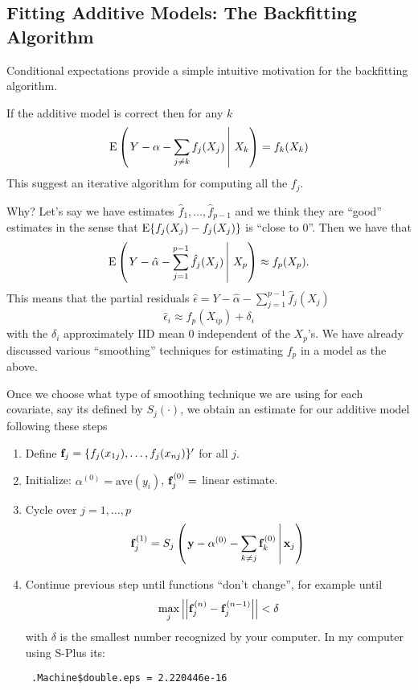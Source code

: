 \centerline{}

\subsection{Fitting Additive Models: The Backfitting Algorithm}
Conditional expectations provide a simple intuitive motivation for the
backfitting algorithm.

If the additive model is correct then for any $k$
\[
\mbox{E}\left(\left. Y - \alpha - \sum_{j\neq k} f_j(X_j) \, \right| \,X_k
\right) = f_k(X_k) 
\]
This suggest an iterative algorithm for computing all the $f_j$. 

Why? Let's say we have estimates $\hat{f}_1,\dots,\hat{f}_{p-1}$ and we
think they are ``good'' estimates in the sense that $\mbox{E}\{{f}_j(X_j) -
f_j(X_j)\}$ is ``close to 0''. Then we have that 
\[ 
\mbox{E}\left(\left.Y - \hat{\alpha} - \sum_{j=1}^{p-1} \hat{f}_j(X_j) \,
  \right| \, X_p \right) 
\approx f_p(X_p).
\]
This means that the partial residuals $\hat{\epsilon} = Y -
\hat{\alpha} - \sum_{j=1}^{p-1} \hat{f}_j(X_j) $ 
\[
\hat{\epsilon}_i \approx f_p(X_{ip}) + \delta_i
\]
with the $\delta_i$ approximately IID mean 0 independent of the
$X_p$'s. We have already discussed various ``smoothing'' techniques
for estimating $f_p$ in a model as the above.

Once we choose what type of smoothing technique we are using
for each covariate, say its defined by $S_j(\cdot)$, we obtain an
estimate for our 
additive model following these steps 
\begin{enumerate}
\item Define ${\mathbf f}_j = \{f_j(x_{1j}),\dots,f_j(x_{nj})\}'$ for all $j$.
\item Initialize: $\alpha^{(0)} = \mbox{ave}(y_i)$, ${\mathbf f}_j^{(0)} = $ linear
  estimate. 
\item Cycle over $j=1,\dots,p$
\[
{\mathbf f}_j^{(1)} = S_j\left(\left. {\mathbf y} - \alpha^{(0)} - \sum_{k\neq j}
  \mathbf{f}^{(0)}_k
  \, \right| {\mathbf x}_j \right)
\]
\item Continue previous step until functions ``don't change'', for
  example until 
\[
\max_{j} \left|\left| {\mathbf f}_j^{(n)} - {\mathbf f}_j^{(n-1)} \right|\right| < \delta
\]
with $\delta$ is the smallest number recognized by your computer. In
my computer using S-Plus its: \begin{verbatim} .Machine$double.eps = 2.220446e-16 \end{verbatim} %


\end{enumerate}  

